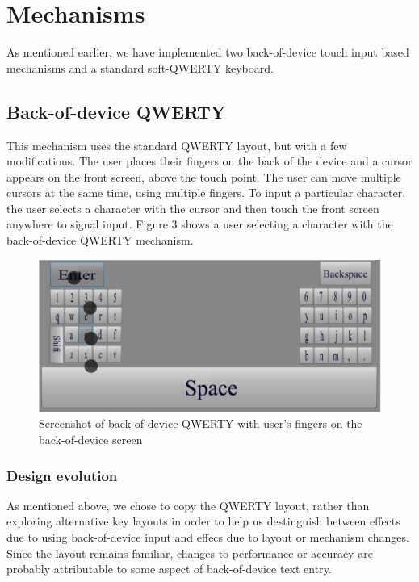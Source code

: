 \section{Mechanisms}

As mentioned earlier, we have implemented two back-of-device touch input based mechanisms and a standard soft-QWERTY keyboard. 

\subsection{Back-of-device QWERTY}

This mechanism uses the standard QWERTY layout, but with a few
modifications. The user places their fingers on the back of the device
and a cursor appears on the front screen, above the touch point.  The
user can move multiple cursors at the same time, using multiple
fingers. To input a particular character, the user selects a
character with the cursor and then touch the front screen
anywhere to signal input. Figure 3 shows a user selecting a character
with the back-of-device QWERTY mechanism.

\begin{figure}
    \includegraphics[scale=0.45]{Figures/backside.pdf} 
    \caption{Screenshot of back-of-device QWERTY with user's fingers on the
      back-of-device screen}
\end{figure}

\subsubsection{Design evolution}

As mentioned above, we chose to copy the QWERTY layout, rather than
exploring alternative key layouts in order to help us destinguish
between effects due to using back-of-device input and effecs due to
layout or mechanism changes.  Since the layout remains familiar,
changes to performance or accuracy are probably attributable to some
aspect of back-of-device text entry.

